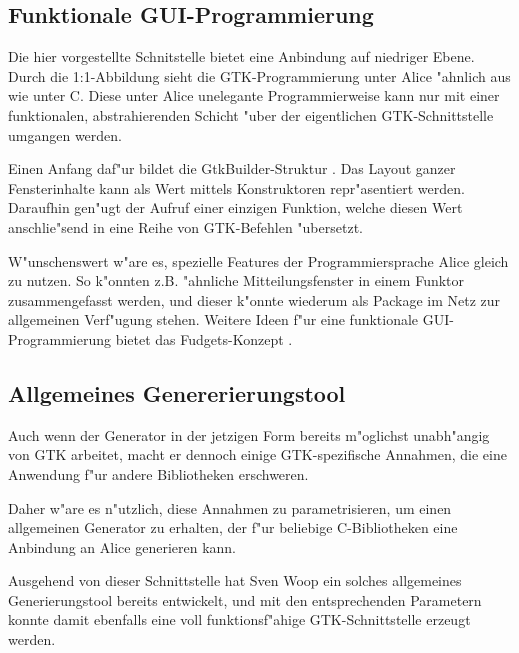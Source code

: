 \documentclass[a4paper,titlepage]{article}
\begin{document}
\subsection*{Funktionale GUI-Programmierung}

Die hier vorgestellte Schnitstelle bietet eine Anbindung auf niedriger Ebene.
Durch die 1:1-Abbildung sieht die GTK-Programmierung unter Alice "ahnlich
aus wie unter C. Diese unter Alice unelegante Programmierweise kann
nur mit einer funktionalen, abstrahierenden Schicht "uber der
eigentlichen GTK-Schnittstelle umgangen werden.

Einen Anfang daf"ur bildet die GtkBuilder-Struktur \cite{gtkbuilder}.
Das Layout ganzer Fensterinhalte kann als Wert mittels Konstruktoren
repr"asentiert werden. Daraufhin gen"ugt der Aufruf einer einzigen Funktion,
welche diesen Wert anschlie"send in eine Reihe von GTK-Befehlen "ubersetzt.

W"unschenswert w"are es, spezielle Features der Programmiersprache Alice
gleich zu nutzen. So k"onnten z.B. "ahnliche Mitteilungsfenster
in einem Funktor zusammengefasst werden, und dieser k"onnte wiederum als
Package im Netz zur allgemeinen Verf"ugung stehen. Weitere Ideen
f"ur eine funktionale GUI-Programmierung bietet das Fudgets-Konzept
\cite{fudgets}. 

\subsection*{Allgemeines Genererierungstool}

Auch wenn der Generator in der jetzigen Form bereits m"oglichst unabh"angig
von GTK arbeitet, macht er dennoch einige GTK-spezifische Annahmen, die
eine Anwendung f"ur andere Bibliotheken erschweren.

Daher w"are es n"utzlich, diese Annahmen zu parametrisieren, um einen
allgemeinen Generator zu erhalten, der f"ur beliebige C-Bibliotheken
eine Anbindung an Alice generieren kann. 

Ausgehend von dieser Schnittstelle hat Sven Woop ein solches allgemeines
Generierungstool bereits entwickelt,
und mit den entsprechenden Parametern konnte damit ebenfalls eine
voll funktionsf"ahige GTK-Schnittstelle erzeugt werden.
\end{document}
